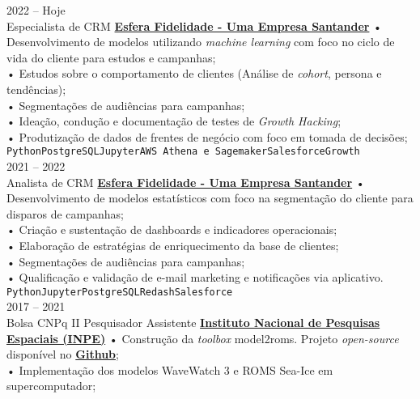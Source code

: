 \documentclass[9pt]{developercv} %
\begin{document}
\begin{entrylist}
	\entry
		{2022 --  Hoje\\}
		{Especialista de CRM}
		{\href{https://www.esfera.com.vc}{\textcolor{bleu_cite}{\textbf{Esfera Fidelidade - Uma Empresa Santander}}}}
		{• Desenvolvimento de modelos utilizando \textit{machine learning} com foco no ciclo de vida do cliente para estudos e campanhas;\\
		• Estudos sobre o comportamento de clientes (Análise de \textit{cohort}, persona e tendências);\\ 
		• Segmentações de audiências para campanhas;\\
		• Ideação, condução e documentação de testes de \textit{Growth Hacking};\\
		• Produtização de dados de frentes de negócio com foco em tomada de decisões;\\
		\texttt{Python}\slashsep\texttt{PostgreSQL}\slashsep\texttt{Jupyter}\slashsep\texttt{AWS Athena e Sagemaker}\slashsep\texttt{Salesforce}\slashsep\texttt{Growth}}
		\\\entry
		{2021 --  2022\\}
		{Analista de CRM}
		{\href{https://www.esfera.com.vc}{\textcolor{bleu_cite}{\textbf{Esfera Fidelidade - Uma Empresa Santander}}}}
		{• Desenvolvimento de modelos estatísticos com foco na segmentação do cliente para disparos de campanhas;\\
		• Criação e sustentação de dashboards e indicadores operacionais;\\
		• Elaboração de estratégias de enriquecimento da base de clientes;\\
		• Segmentações de audiências para campanhas;\\
		• Qualificação e validação de e-mail marketing e notificações via aplicativo.\\
		\texttt{Python}\slashsep\texttt{Jupyter}\slashsep\texttt{PostgreSQL}\slashsep\texttt{Redash}\slashsep\texttt{Salesforce}}
		\\\entry
		{2017 -- 2021\\\footnotesize{Bolsa CNPq II}}
		{Pesquisador Assistente}
		{\href{https://www.gov.br/inpe/pt-br}{\textcolor{bleu_cite}{\textbf{Instituto Nacional de Pesquisas Espaciais (INPE)}}}}
		{• Construção da \textit{toolbox} model2roms. Projeto \textit{open-source} disponível no \href{https://github.com/uesleisutil/model2roms}{\textcolor{bleu_cite}{\textbf{Github}}}; \\	
		• Implementação dos modelos WaveWatch 3 e ROMS Sea-Ice em supercomputador;\\
}
\end{entrylist}
\end{document}
